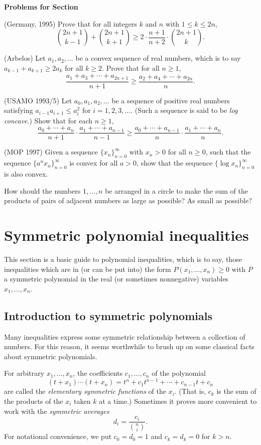 \documentclass[12pt]{report}
\def\ii{\item}
\newcounter{exc}
\numberwithin{exc}{section}
\newenvironment{exer}{\vspace{0.1in}
\noindent \textbf{Problems for Section~\thesection} \vspace{0.1in}
\begin{list}{\arabic{exc}.}{\usecounter{exc}}}{\end{list}}
\begin{document}
\begin{exer}
\ii (Germany, 1995)
Prove that for all integers $k$ and $n$ with $1 \leq k \leq 2n$,
\[
\binom{2n+1}{k-1} + \binom{2n+1}{k+1} \geq 2 \cdot \frac{n+1}{n+2} 
\cdot \binom{2n+1}{k}.
\]
\ii (Arbelos)
Let $a_{1}, a_{2}, \dots$ be a convex sequence of real numbers, which 
is to say $a_{k-1}+a_{k+1} \geq 2a_{k}$ for all $k \geq 2$. Prove that 
for all $n \geq 1$,
\[
\frac{a_{1} + a_{3}+ \cdots + a_{2n+1}}{n+1} \geq \frac{a_{2} + 
a_{4}+ \cdots + a_{2n}}{n}.
\]
\ii
(USAMO 1993/5)
Let $a_{0}, a_{1}, a_{2}, \dots$ be a sequence of positive real 
numbers satisfying $a_{i-1}a_{i+1} \leq a_{i}^{2}$ for 
$i=1,2,3,\dots$. (Such a sequence is said to be \emph{log concave}.) 
Show that for each $n \geq 1$,
\[
\frac{a_{0} + \cdots + a_{n}}{n+1} \cdot \frac{a_{1} + \cdots + 
a_{n-1}}{n-1} \geq \frac{a_{0} + \cdots + a_{n-1}}{n} \cdot 
\frac{a_{1} + \cdots + a_{n}}{n}.
\]
\ii (MOP 1997)
Given a sequence $\{x_n\}_{n=0}^\infty$ with $x_n > 0$ for all $n\geq0$,
such that the sequence $\{a^n x_n\}_{n=0}^\infty$ is convex for all $a>0$,
show that the sequence $\{\log x_n\}_{n=0}^\infty$ is also convex.
\ii
How should the numbers $1, \dots, n$ be arranged in a circle to make 
the sum of the products of pairs of adjacent numbers as large as 
possible? As small as possible?
\end{exer}

\chapter{Symmetric polynomial inequalities}
This section is a basic guide to polynomial inequalities, which is to 
say, those inequalities which are in (or can be put into) the form 
$P(x_{1}, \dots, x_{n}) \geq 0$ with $P$ a symmetric polynomial in the real (or 
sometimes nonnegative) variables $x_{1}, \dots, x_{n}$.


\section{Introduction to symmetric polynomials}
Many inequalities express some symmetric relationship between a 
collection of numbers. For this reason, it seems worthwhile to brush 
up on some classical facts about symmetric polynomials.

For arbitrary $x_{1}, \dots, x_{n}$, the coefficients $c_{1}, \dots, 
c_{n}$ of the polynomial
\[
(t + x_{1})\cdots (t + x_{n}) = t^{n} + c_{1} t^{n-1} + \cdots + 
c_{n-1}t + c_{n}
\]
are called the \emph{elementary symmetric functions} of the $x_{i}$. 
(That is, $c_{k}$ is the sum of the products of the $x_{i}$ taken $k$ 
at a time.)
Sometimes it proves more convenient to work with the \emph{symmetric 
averages}
\[
d_{i} = \frac{c_{i}}{\binom ni}.
\]
For notational convenience, we put $c_{0} = d_{0} = 1$ and $c_{k} = 
d_{k} = 0$ for $k > n$.
\end{document}

